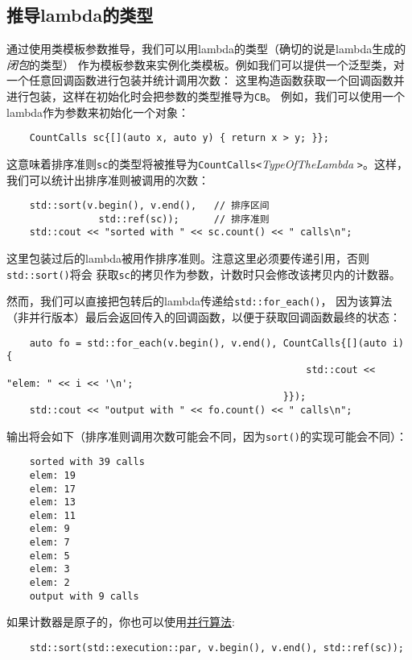 \subsection{推导lambda的类型}
通过使用类模板参数推导，我们可以用lambda的类型（确切的说是lambda生成的\emph{闭包}的类型）
作为模板参数来实例化类模板。例如我们可以提供一个泛型类，对一个任意回调函数进行包装并统计调用次数：
这里构造函数获取一个回调函数并进行包装，这样在初始化时会把参数的类型推导为\texttt{CB}。
例如，我们可以使用一个lambda作为参数来初始化一个对象：
\begin{lstlisting}
    CountCalls sc{[](auto x, auto y) { return x > y; }};
\end{lstlisting}
这意味着排序准则\texttt{sc}的类型将被推导为\texttt{CountCalls<}\emph{TypeOfTheLambda}
\texttt{>}。这样，我们可以统计出排序准则被调用的次数：
\begin{lstlisting}
    std::sort(v.begin(), v.end(),   // 排序区间
                std::ref(sc));      // 排序准则
    std::cout << "sorted with " << sc.count() << " calls\n";
\end{lstlisting}
这里包装过后的lambda被用作排序准则。注意这里必须要传递引用，否则\texttt{std::sort()}将会
获取\texttt{sc}的拷贝作为参数，计数时只会修改该拷贝内的计数器。

然而，我们可以直接把包转后的lambda传递给\texttt{std::for\_each()}，
因为该算法（非并行版本）最后会返回传入的回调函数，以便于获取回调函数最终的状态：
\begin{lstlisting}
    auto fo = std::for_each(v.begin(), v.end(), CountCalls{[](auto i) {
                                                    std::cout << "elem: " << i << '\n';
                                                }});
    std::cout << "output with " << fo.count() << " calls\n";
\end{lstlisting}
输出将会如下（排序准则调用次数可能会不同，因为\texttt{sort()}的实现可能会不同）：
\begin{lstlisting}
    sorted with 39 calls
    elem: 19
    elem: 17
    elem: 13
    elem: 11
    elem: 9
    elem: 7
    elem: 5
    elem: 3
    elem: 2
    output with 9 calls
\end{lstlisting}
如果计数器是原子的，你也可以使用\hyperref[ch22]{并行算法}:
\begin{lstlisting}
    std::sort(std::execution::par, v.begin(), v.end(), std::ref(sc));
\end{lstlisting}

